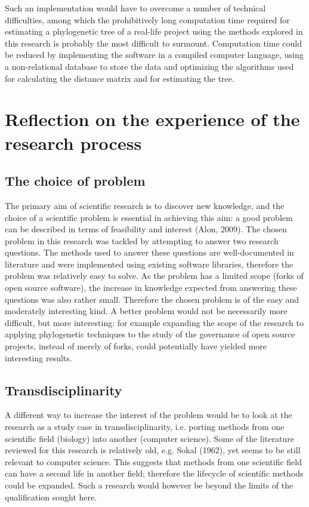 Such an implementation would have to overcome a number of technical difficulties, among which the prohibitively long computation time required for estimating a phylogenetic tree of a real-life project using the methods explored in this research is probably the most difficult to surmount. Computation time could be reduced by implementing the software in a compiled computer language, using a non-relational database to store the data and optimizing the algorithms used for calculating the distance matrix and for estimating the tree.

\section{Reflection on the experience of the research process}

\subsection{The choice of problem}
The primary aim of scientific research is to discover new knowledge, and the choice of a scientific problem is essential in achieving this aim: a good problem can be described in terms of feasibility and interest (Alon, 2009). The chosen problem in this research was tackled by attempting to answer two research questions. The methods used to answer these questions are well-documented in literature and were implemented using existing software libraries, therefore the problem was relatively easy to solve. As the problem has a limited scope (forks of open source software), the increase in knowledge expected from answering these questions was also rather small. Therefore the chosen problem is of the easy and moderately interesting kind. A better problem would not be necessarily more difficult, but more interesting: for example expanding the scope of the research to applying phylogenetic techniques to the study of the governance of open source projects, instead of merely of forks, could potentially have yielded more interesting results.

\subsection{Transdisciplinarity}
A different way to increase the interest of the problem would be to look at the research as a study case in transdisciplinarity, i.e. porting methods from one scientific field (biology) into another (computer science). Some of the literature reviewed for this research is relatively old, e.g. Sokal (1962), yet seems to be still relevant to computer science. This suggests that methods from one scientific field can have a second life in another field; therefore the lifecycle of scientific methods could be expanded. Such a research would however be beyond the limits of the qualification sought here.
